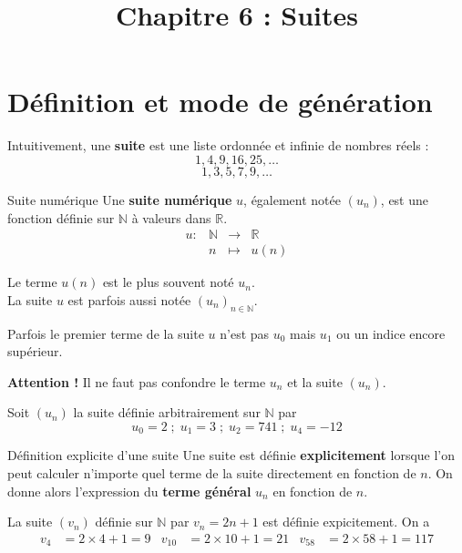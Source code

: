 \documentclass[11pt]{article}
\title{Chapitre 6 : Suites}
\date{}
\author{}
\begin{document}
\maketitle\thispagestyle{fancy}

\section{Définition et mode de génération}
Intuitivement, une \textbf{suite} est une liste ordonnée et infinie de nombres
réels :
\[
  1, 4, 9, 16, 25, \dots
\]
\[
  1, 3, 5, 7, 9, \dots
\]
\begin{defi}{Suite numérique}
  Une \textbf{suite numérique} $u$, également notée
  $(u_n)$, est une fonction définie sur $\mathbb{N}$ à valeurs dans $\mathbb{R}$.
  \[
  \begin{array}{cccc}
    u: & \mathbb{N} & \to & \mathbb{R} \\
    & n & \mapsto & u(n)
  \end{array}
\]
\end{defi}
\begin{notation}
  Le terme $u(n)$ est le plus souvent noté $u_n$.\\
  La suite $u$ est parfois aussi notée $(u_n)_{n\in\mathbb{N}}$.
\end{notation}

\begin{rmq}
  Parfois le premier terme de la suite $u$ n'est pas $u_0$ mais $u_1$ ou un
  indice encore supérieur.
\end{rmq}
\begin{rmq}
  \textbf{Attention !} Il ne faut pas confondre le terme $u_n$ et la suite
  $(u_n)$.
\end{rmq}

\begin{exemple}
  Soit $(u_n)$ la suite définie arbitrairement sur $\mathbb{N}$ par
  \[
    u_0 = 2
    \;;\;
    u_1 = 3
    \;;\;
    u_2 = 741
    \;;\;
    u_4 = -12 
  \]
\end{exemple}
\begin{defi}{Définition explicite d'une suite}
  Une suite est définie \textbf{explicitement} lorsque l'on peut calculer
  n'importe quel terme de la suite directement en fonction de $n$. On donne
  alors l'expression du \textbf{terme général} $u_n$ en fonction de $n$.
\end{defi}
\begin{exemple}
  La suite $(v_n)$ définie sur $\mathbb{N}$ par $v_n=2n+1$ est définie
  expicitement. On a 
  \begin{align*}
    v_4 &= 2 \times 4+1 = 9 &
    v_{10} &= 2 \times 10 +1 = 21 &
    v_{58} &= 2 \times 58 +1 = 117
  \end{align*}
\end{exemple}
\end{document}
